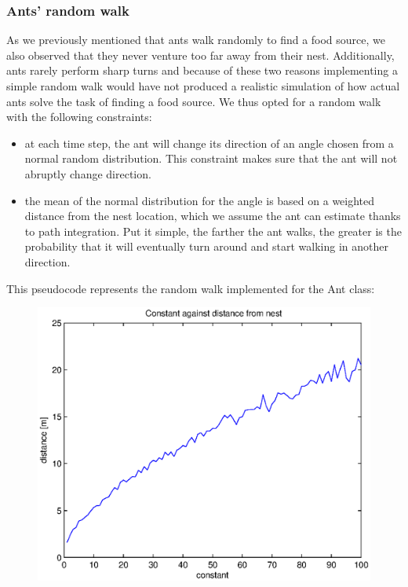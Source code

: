 \documentclass[11pt]{article}
\begin{document}
\subsubsection {Ants' random walk}
As we previously mentioned that ants walk randomly to find a food source, we also observed that they never venture too far away from their nest. Additionally, ants rarely perform sharp turns and because of these two reasons implementing a simple random walk would have not produced a realistic simulation of how actual ants solve the task of finding a food source. We thus opted for a random walk with the following constraints:

\begin{itemize}
\item at each time step, the ant will change its direction of an angle chosen from a normal random distribution. This constraint makes sure that the ant will not abruptly change direction.
\item the mean of the normal distribution for the angle is based on a weighted distance from the nest location, which we assume the ant can estimate thanks to path integration. Put it simple, the farther the ant walks, the greater is the probability that it will eventually turn around and start walking in another direction.
\end{itemize}

This pseudocode represents the random walk implemented for the Ant class:



\begin{figure}[h!]
	\includegraphics[width=.9\textwidth]{../sources/results/constantAgainstDistance.eps}
	\caption{}
\end{figure}
\end{document}
